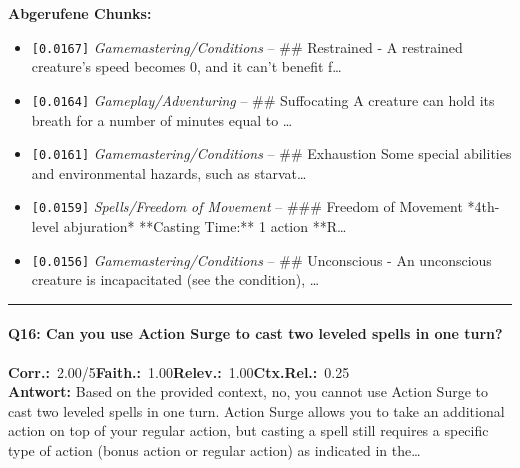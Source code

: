 \noindent\textbf{Abgerufene Chunks:}
\begin{itemize}[noitemsep, topsep=2pt]
  \item[\textbf{\#1}] \texttt{[0.0167]} \textit{Gamemastering/Conditions} -- \#\# Restrained  - A restrained creature's speed becomes 0, and it can't benefit f\ldots
  \item[\textbf{\#2}] \texttt{[0.0164]} \textit{Gameplay/Adventuring} -- \#\# Suffocating  A creature can hold its breath for a number of minutes equal to \ldots
  \item[\textbf{\#3}] \texttt{[0.0161]} \textit{Gamemastering/Conditions} -- \#\# Exhaustion  Some special abilities and environmental hazards, such as starvat\ldots
  \item[\textbf{\#4}] \texttt{[0.0159]} \textit{Spells/Freedom of Movement} -- \#\#\# Freedom of Movement  *4th-level abjuration*  **Casting Time:** 1 action  **R\ldots
  \item[\textbf{\#5}] \texttt{[0.0156]} \textit{Gamemastering/Conditions} -- \#\# Unconscious  - An unconscious creature is incapacitated (see the condition), \ldots
\end{itemize}
\vspace{4pt}
\hrule
\vspace{6pt}

\paragraph{Q16: Can you use Action Surge to cast two leveled spells in one turn?}
\noindent \textbf{Corr.:}~2.00/5\quad \textbf{Faith.:}~1.00\quad \textbf{Relev.:}~1.00\quad \textbf{Ctx.Rel.:}~0.25\\

\noindent\textbf{Antwort:} Based on the provided context, no, you cannot use Action Surge to cast two leveled spells in one turn. Action Surge allows you to take an additional action on top of your regular action, but casting a spell still requires a specific type of action (bonus action or regular action) as indicated in the\ldots

